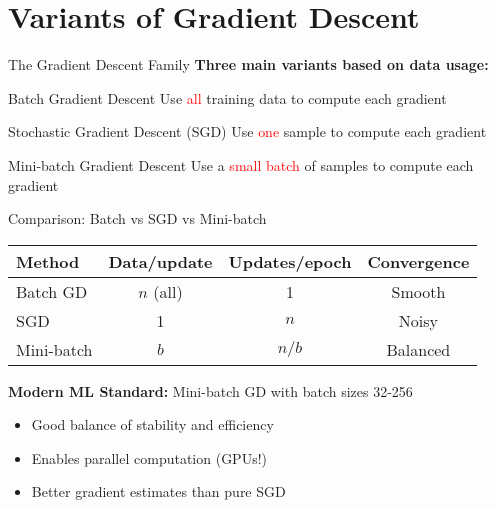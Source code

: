 \documentclass[usenames,dvipsnames]{beamer}
\begin{document}
  \section{Variants of Gradient Descent}

  \begin{frame}{The Gradient Descent Family}
    \textbf{Three main variants based on data usage:}
    
    \begin{definitionbox}{Batch Gradient Descent}
    Use \textcolor{red}{all} training data to compute each gradient
    \end{definitionbox}
    
    \begin{definitionbox}{Stochastic Gradient Descent (SGD)}
    Use \textcolor{red}{one} sample to compute each gradient
    \end{definitionbox}
    
    \begin{definitionbox}{Mini-batch Gradient Descent}
    Use a \textcolor{red}{small batch} of samples to compute each gradient
    \end{definitionbox}
  \end{frame}

  \begin{frame}{Comparison: Batch vs SGD vs Mini-batch}
    \begin{center}
    \begin{tabular}{|l|c|c|c|}
        \hline
        \textbf{Method} & \textbf{Data/update} & \textbf{Updates/epoch} & \textbf{Convergence} \\
        \hline
        Batch GD & $n$ (all) & 1 & Smooth \\
        \hline
        SGD & 1 & $n$ & Noisy \\
        \hline
        Mini-batch & $b$ & $n/b$ & Balanced \\
        \hline
    \end{tabular}
    \end{center}
    
    \pause
    \begin{keypointsbox}{}
    \textbf{Modern ML Standard:} Mini-batch GD with batch sizes 32-256
    \begin{itemize}
        \item Good balance of stability and efficiency
        \item Enables parallel computation (GPUs!)
        \item Better gradient estimates than pure SGD
    \end{itemize}
    \end{keypointsbox}
  \end{frame}
\end{document}
